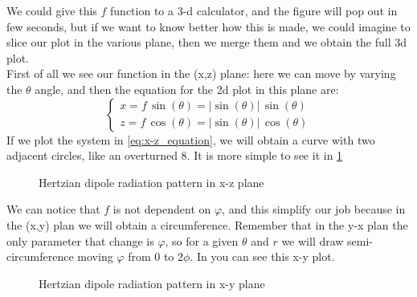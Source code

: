 We could give this $f$ function to a 3-d calculator, and the figure will pop out in few seconds, but if we want to know better how this is made, we could imagine to slice our plot in the various plane, then we merge them and we obtain the full 3d plot.\\
First of all we see our function in the (x,z) plane: here we can move by varying the $\theta$ angle, and then the equation for the 2d plot in this plane are:
\begin{equation}
    \begin{cases}
        x=f\,\sin(\theta)=|\sin(\theta)|\,\sin(\theta)\\[5pt]
        z=f\,\cos(\theta)=|\sin(\theta)|\,\cos(\theta)
    \end{cases}\label{eq:x-z_equation}
\end{equation}
If we plot the system in \cref{eq:x-z_equation}, we will obtain a curve with two adjacent circles, like an overturned $8$. It is more simple to see it in \cref{fig:Dipolexz}
\begin{figure}[H]
    \begin{center}
        \caption{Hertzian dipole radiation pattern in x-z plane}\label{fig:Dipolexz}
    \end{center}
\end{figure}
We can notice that $f$ is not dependent on $\varphi$, and this simplify our job because in the (x,y) plan we will obtain a circumference. Remember that in the y-x plan the only parameter that change is $\varphi$, so for a given $\theta$ and $r$ we will draw semi-circumference moving $\varphi$ from $0$ to $2\phi$. In you can see this x-y plot.
\begin{figure}[H]
    \begin{center}
        \caption{Hertzian dipole radiation pattern in x-y plane}\label{fig:Dipolexy}
    \end{center}
\end{figure}
